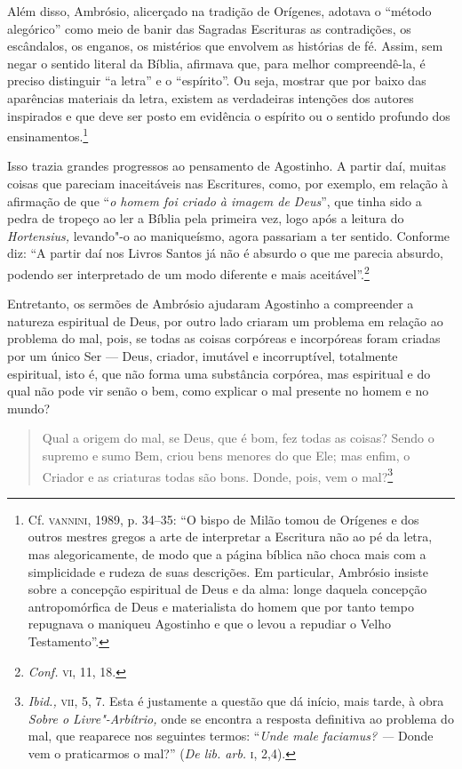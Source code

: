 Além disso, Ambrósio, alicerçado na tradição de Orígenes, adotava
o “método alegórico” como meio de banir das Sagradas Escrituras
as contradições,  os escândalos, os enganos, os mistérios que
envolvem as histórias de fé. Assim, sem negar o sentido literal
da Bíblia, afirmava que, para melhor compreendê-la, é preciso
distinguir “a letra” e  o “espírito”. Ou seja, mostrar que por
baixo das aparências materiais da letra, existem as verdadeiras
intenções dos autores inspirados e que deve ser posto em
evidência o espírito ou o sentido profundo dos 
ensinamentos.\footnote{ Cf. \textsc{vannini}, 1989, p. 34--35: “O bispo de
Milão tomou de Orígenes e dos outros mestres gregos a arte de
interpretar a  Escritura não ao pé da letra, mas 
alegoricamente, de modo que a  página bíblica  não choca mais
com a simplicidade e rudeza de suas  descrições. Em particular,
Ambrósio insiste sobre a concepção espiritual de Deus e da alma:
longe daquela concepção antropomórfica de Deus e materialista do
homem que por tanto tempo repugnava o maniqueu Agostinho e que o
levou a repudiar o Velho Testamento”.} 

Isso trazia grandes progressos ao pensamento de Agostinho. A
partir daí, muitas coisas que pareciam inaceitáveis nas
Escritures,  como, por exemplo, em relação à afirmação de que
“\emph{o homem foi criado à imagem de Deus}”,  que tinha sido
a pedra de tropeço  ao ler a Bíblia pela primeira vez, logo após
a leitura do \emph{Hortensius,} levando"-o ao maniqueísmo,
agora passariam a ter sentido. Conforme diz: “A partir daí  nos
Livros Santos já não é absurdo o que me parecia absurdo, podendo
ser interpretado de um modo diferente e mais
aceitável”.\footnote{ \emph{Conf.} \textsc{vi}, 11, 18.}

Entretanto, os sermões de Ambrósio ajudaram Agostinho a
compreender a natureza espiritual de Deus, por outro lado
criaram um problema em relação ao problema do mal, pois, se
todas as coisas corpóreas e incorpóreas foram criadas por um
único Ser --- Deus, criador, imutável e incorruptível,  totalmente
espiritual, isto é, que não forma uma substância  corpórea, mas
espiritual e do qual não pode vir senão o bem, como explicar o
mal presente no homem e no mundo?

\begin{quote}
Qual a origem do mal, se Deus, que é bom, fez todas as coisas?
Sendo o supremo e sumo Bem, criou bens menores do que Ele; mas
enfim, o Criador e as criaturas todas são bons. Donde, pois, vem
o mal?\footnote{ \emph{Ibid.,} \textsc{vii}, 5, 7. Esta é justamente a
questão que dá início, mais tarde, à obra  \emph{Sobre o
Livre"-Arbítrio,} onde se encontra a resposta definitiva ao
problema do mal, que reaparece nos seguintes termos:
“\emph{Unde male faciamus? ---} Donde vem o praticarmos o mal?”
(\emph{De lib. arb.} \textsc{i}, 2,4).}  
\end{quote}

